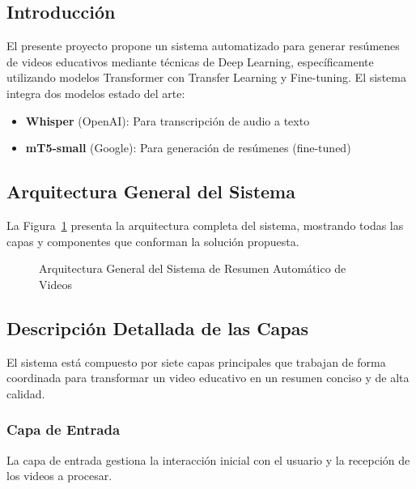 \documentclass[12pt,a4paper]{article}
\begin{document}
\subsection{Introducción}

El presente proyecto propone un sistema automatizado para generar resúmenes de videos educativos mediante técnicas de Deep Learning, específicamente utilizando modelos Transformer con Transfer Learning y Fine-tuning. El sistema integra dos modelos estado del arte:

\begin{itemize}[leftmargin=*]
    \item \textbf{Whisper} (OpenAI): Para transcripción de audio a texto
    \item \textbf{mT5-small} (Google): Para generación de resúmenes (fine-tuned)
\end{itemize}

\subsection{Arquitectura General del Sistema}

La Figura~\ref{fig:arquitectura_general} presenta la arquitectura completa del sistema, mostrando todas las capas y componentes que conforman la solución propuesta.

\begin{figure}[H]
    \centering
    \caption{Arquitectura General del Sistema de Resumen Automático de Videos}
    \label{fig:arquitectura_general}
\end{figure}

\newpage

\subsection{Descripción Detallada de las Capas}

El sistema está compuesto por siete capas principales que trabajan de forma coordinada para transformar un video educativo en un resumen conciso y de alta calidad.

\subsubsection{Capa de Entrada}

La capa de entrada gestiona la interacción inicial con el usuario y la recepción de los videos a procesar.
\end{document}
